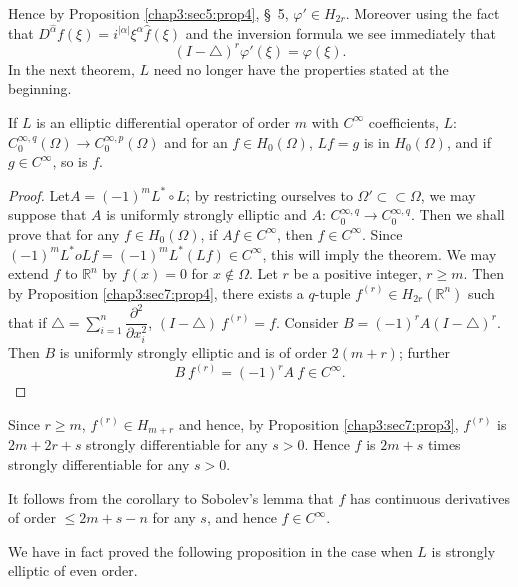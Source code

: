 Hence by Proposition \ref{chap3:sec5:prop4}, \S\ 5, $\varphi' \in H_{2r}$. Moreover using
the fact that $D^{\hat{\alpha}} f (\xi) = i^{| \alpha |} \xi^\alpha
\hat{f} (\xi)$ and the inversion formula we see immediately that  
$$
(I - \triangle )^r \varphi' (\xi ) = \varphi (\xi ).
$$
In the next theorem, $L$ need no longer have the properties stated at
the beginning. 

\begin{theorem*}
  If $L$ is an elliptic differential operator of order $m$ with
  $C^\infty$ coefficients, $L$: $C^{\infty, q}_0 (\Omega ) \to
  C^{\infty, p}_0 (\Omega )$ and for an $f \in H_0 (\Omega )$, $Lf = g
  $ is in $H_0 (\Omega)$, and if $g \in C^\infty$, so is $f$. 
\end{theorem*}

\begin{proof}
  Let\pageoriginale $A = (-1)^m L^* \circ L$; by restricting ourselves to $\Omega'
  \subset \subset \Omega$, we may suppose that $A$ is uniformly
  strongly elliptic and $A$: $C^{\infty, q}_0 \to C^{\infty,
    q}_0$. Then we shall prove that for any $f \in H_0 (\Omega)$, if
  $A f \in C^\infty$, then $f \in C^\infty$. Since $(-1)^m L^*o L f =
  (-1)^m L^* (Lf) \in C^\infty$, this will imply the theorem. We may
  extend $f$ to $\mathbb{R}^n$ by $f(x) = 0$ for $x \notin
  \Omega$. Let $r$ be a positive integer, $r \geq m$. Then by
  Proposition \ref{chap3:sec7:prop4}, there exists a $q$-tuple $f^{(r)} \in H_{2r}
  (\mathbb{R}^n)$ such that if $\triangle = \sum\limits_{i = 1}^n
  \dfrac{\partial^2}{\partial x^2_i}$, $(I - \triangle) ~ f^{(r)} =
  f$. Consider $B = (-1)^r A(I - \triangle)^r$. Then $B$ is uniformly
  strongly elliptic and is of order $2 (m + r) $; further  
  $$
  B ~ f^{(r)} = (-1)^r A ~ f \in C^\infty.
  $$
\end{proof}

Since $r \geq m$, $f^{(r)} \in H_{m + r}$ and hence, by Proposition
\ref{chap3:sec7:prop3}, $f^{(r)}$ is $2m + 2r + s$ strongly
differentiable for any $s > 
0$. Hence $f$ is $2m + s$ times strongly differentiable for any $ s >
0$. 

It follows from the corollary to Sobolev's lemma that $f$ has
continuous derivatives of order $\leq 2 m + s - n$ for any $s$, and
hence $f \in C^\infty$.  

\begin{remark*}
  We have in fact proved the following proposition in the case when
  $L$ is strongly elliptic of even order. 
\end{remark*}

